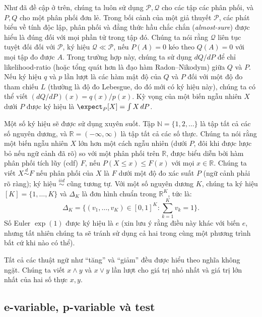 Như đã đề cập ở trên, chúng ta luôn sử dụng $\mathcal{P}, \mathcal{Q}$ cho các
tập các phân phối, và $P, Q$ cho một phân phối đơn lẻ. Trong bối cảnh của một
giả thuyết $\mathcal{P}$, các phát biểu về tính độc lập, phân phối và đẳng thức
hầu chắc chắn (\textit{almost-sure}) được hiểu là đúng đối với mọi phần tử
trong tập đó. Chúng ta nói rằng $\mathcal{Q}$ liên tục tuyệt đối đối với
$\mathcal{P}$, ký hiệu $\mathcal{Q} \ll \mathcal{P}$, nếu $P(A) = 0$ kéo theo
$Q(A) = 0$ với mọi tập đo được $A$. Trong trường hợp này, chúng ta sử dụng
$dQ/dP$ để chỉ \gls{likelihood-ratio} (hoặc tổng quát hơn
là đạo hàm Radon–Nikodym) giữa $Q$ và $P$. Nếu ký hiệu $q$ và $p$ lần lượt là
các hàm mật độ của $Q$ và $P$ đối với một độ đo tham chiếu $L$ (thường là độ đo
Lebesgue, do đó mới có ký hiệu này), chúng ta có thể viết $(dQ/dP)(x) =
q(x)/p(x)$. Kỳ vọng của một biến ngẫu nhiên $X$ dưới $P$ được ký hiệu là
$\expect_P[X] = \int X\,dP$.

Một số ký hiệu sẽ được sử dụng xuyên suốt. Tập $\mathbb{N} = \{1, 2, \dots \}$
là tập tất cả các số nguyên dương, và $\mathbb{R} = (-\infty, \infty)$ là tập
tất cả các số thực. Chúng ta nói rằng một biến ngẫu nhiên $X$ lớn hơn một cách
ngẫu nhiên (dưới $P$, đôi khi được lược bỏ nếu ngữ cảnh đã rõ) so với một phân
phối trên $\mathbb{R}$, được biểu diễn bởi hàm phân phối tích lũy (cdf) $F$,
nếu $P(X \leq x) \leq F(x)$ với mọi $x \in \mathbb{R}$. Chúng ta viết $X
\stackrel{d}{\sim} F$ nếu phân phối của $X$ là $F$ dưới một độ đo xác suất $P$
(ngữ cảnh phải rõ ràng); ký hiệu $\stackrel{iid}{\sim}$ cũng tương tự. Với một
số nguyên dương $K$, chúng ta ký hiệu $[K] = \{1, \dots, K\}$ và $\Delta_K$ là
đơn hình chuẩn trong $\mathbb{R}^K$, tức là:
\begin{equation}
    \Delta_K = \biggl\{ (v_1, \dots, v_K) \in [0, 1]^K : \sum_{k=1}^K v_k = 1
    \biggr\}.
\end{equation} Số Euler $\exp(1)$ được ký hiệu là $e$ (xin lưu ý rằng điều này
khác với biến $e$, nhưng tất nhiên chúng ta sẽ tránh sử dụng cả hai trong cùng
một phương trình bất cứ khi nào có thể).

Tất cả các thuật ngữ như ``tăng'' và ``giảm'' đều được hiểu theo nghĩa không
ngặt.  Chúng ta viết $x \wedge y$ và $x \vee y$ lần lượt cho giá trị nhỏ nhất
và giá trị lớn nhất của hai số thực $x, y$.

\subsection{e-variable, p-variable và test}

